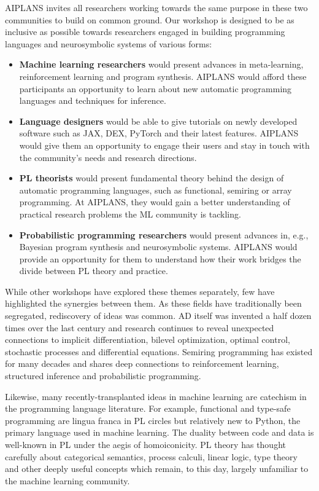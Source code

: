 \documentclass{article}
\begin{document}
    AIPLANS invites all researchers working towards the same purpose in these two communities to build on common ground. Our workshop is designed to be as inclusive as possible towards researchers engaged in building programming languages and neurosymbolic systems of various forms:
    \begin{itemize}
        \item \textbf{Machine learning researchers} would present advances in meta-learning, reinforcement learning and program synthesis. AIPLANS would afford these participants an opportunity to learn about new automatic programming languages and techniques for inference.
        \item \textbf{Language designers} would be able to give tutorials on newly developed software such as JAX, DEX, PyTorch and their latest features. AIPLANS would give them an opportunity to engage their users and stay in touch with the community's needs and research directions.
        \item \textbf{PL theorists} would present fundamental theory behind the design of automatic programming languages, such as functional, semiring or array programming. At AIPLANS, they would gain a better understanding of practical research problems the ML community is tackling.
        \item \textbf{Probabilistic programming researchers} would present advances in, e.g., Bayesian program synthesis and neurosymbolic systems. AIPLANS would provide an opportunity for them to understand how their work bridges the divide between PL theory and practice.
    \end{itemize}

    While other workshops have explored these themes separately, few have highlighted the synergies between them. As these fields have traditionally been segregated, rediscovery of ideas was common. AD itself was invented a half dozen times over the last century and research continues to reveal unexpected connections to implicit differentiation, bilevel optimization, optimal control, stochastic processes and differential equations.  Semiring programming has existed for many decades and shares deep connections to reinforcement learning, structured inference and probabilistic programming.

    Likewise, many recently-transplanted ideas in machine learning are catechism in the programming language literature.  For example, functional and type-safe programming are lingua franca in PL circles but relatively new to Python, the primary language used in machine learning.  The duality between code and data is well-known in PL under the aegis of homoiconicity. PL theory has thought carefully about categorical semantics, process calculi, linear logic, type theory and other deeply useful concepts which remain, to this day, largely unfamiliar to the machine learning community.
\end{document}

